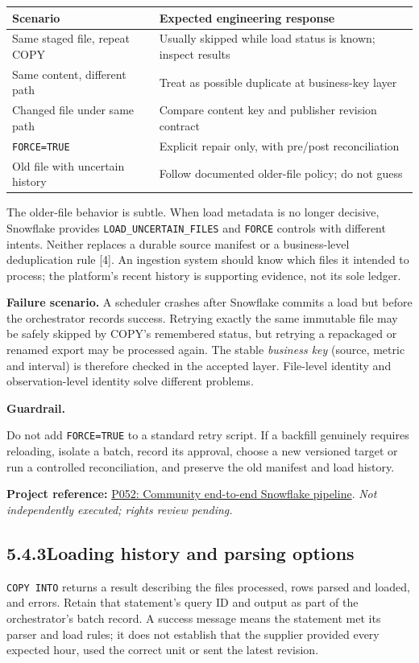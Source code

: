 \documentclass[11pt,twoside]{article}
\newcommand{\topic}[2]{\subsection*{#1\quad #2}}
\newcommand{\repo}[2]{\par\begingroup\fontsize{8.0}{9.6}\selectfont\sffamily\color{inkgray}\textbf{Project reference:} \href{#2}{#1}. \textit{Not independently executed; rights review pending.}\par\endgroup}
\begin{document}
\begin{center}\small\begin{tabularx}{\linewidth}{@{}p{40mm}X@{}}\toprule
Scenario & Expected engineering response\\\midrule
Same staged file, repeat COPY & Usually skipped while load status is known; inspect results\\
Same content, different path & Treat as possible duplicate at business-key layer\\
Changed file under same path & Compare content key and publisher revision contract\\
\texttt{FORCE=TRUE} & Explicit repair only, with pre/post reconciliation\\
Old file with uncertain history & Follow documented older-file policy; do not guess\\\bottomrule\end{tabularx}\end{center}
The older-file behavior is subtle. When load metadata is no longer decisive, Snowflake provides \texttt{LOAD\_UNCERTAIN\_FILES} and \texttt{FORCE} controls with different intents. Neither replaces a durable source manifest or a business-level deduplication rule [4]. An ingestion system should know which files it intended to process; the platform's recent history is supporting evidence, not its sole ledger.

\textbf{Failure scenario.} A scheduler crashes after Snowflake commits a load but before the orchestrator records success. Retrying exactly the same immutable file may be safely skipped by COPY's remembered status, but retrying a repackaged or renamed export may be processed again. The stable \emph{business key} (source, metric and interval) is therefore checked in the accepted layer. File-level identity and observation-level identity solve different problems.

\begin{insight}\textbf{Guardrail.}\par
Do not add \texttt{FORCE=TRUE} to a standard retry script. If a backfill genuinely requires reloading, isolate a batch, record its approval, choose a new versioned target or run a controlled reconciliation, and preserve the old manifest and load history.\end{insight}
\repo{P052: Community end-to-end Snowflake pipeline}{https://github.com/AvinashAnalytics/End-to-End-Snowflake-Data-Pipeline}
\newpage
\topic{5.4.3}{Loading history and parsing options}
\texttt{COPY INTO} returns a result describing the files processed, rows parsed and loaded, and errors. Retain that statement's query ID and output as part of the orchestrator's batch record. A success message means the statement met its parser and load rules; it does not establish that the supplier provided every expected hour, used the correct unit or sent the latest revision.
\end{document}
